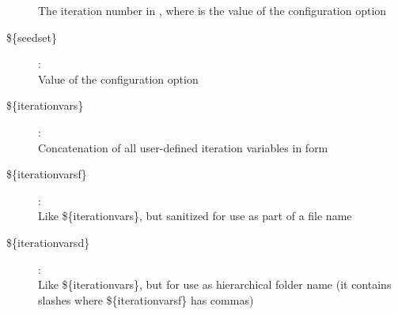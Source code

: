 \begin{description}
    The iteration number in , where
     is the value of the  configuration option
\item[\$\{seedset\}] : \\
    Value of the  configuration option
\item[\$\{iterationvars\}] : \\
    Concatenation of all user-defined iteration variables in
     form
\item[\$\{iterationvarsf\}] : \\
    Like \$\{iterationvars\}, but sanitized for use as part of a file name
\item[\$\{iterationvarsd\}] : \\
    Like \$\{iterationvars\}, but for use as hierarchical folder name (it
    contains slashes where \$\{iterationvarsf\} has commas)
\end{description}

